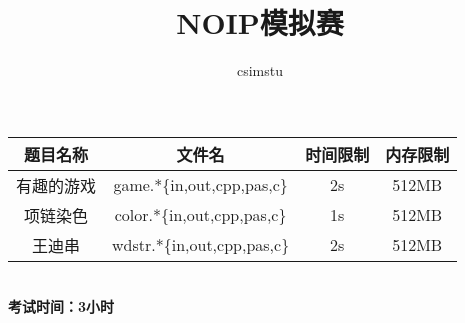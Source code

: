 \documentclass[a4paper]{article}
\begin{document}
\title{NOIP模拟赛}
\author{csimstu}
\maketitle
\begin{center}
\begin{tabular}{|c|c|c|c|}
\hline
题目名称 & 文件名 & 时间限制 & 内存限制 \\ \hline
有趣的游戏 & game.*\{in,out,cpp,pas,c\} & 2s & 512MB \\ \hline
项链染色 & color.*\{in,out,cpp,pas,c\} & 1s & 512MB \\ \hline
王迪串 & wdstr.*\{in,out,cpp,pas,c\} & 2s & 512MB \\ \hline
\end{tabular}
\vspace{15pt}
\\ {\large\textbf{考试时间：3小时}}
\end{center}
\tableofcontents




\end{document}
